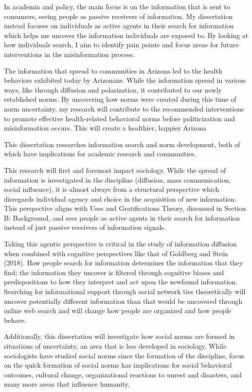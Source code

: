 In academia and policy, the main focus is on the information that is
sent to consumers, seeing people as passive receivers of information. My dissertation instead
focuses on individuals as active agents in their search for information
which helps me uncover the information individuals are exposed to. By
looking at how individuals search, I aim to identify pain points and focus areas for
future interventions in the misinformation process.

The information that spread to communities in Arizona led to the health
behaviors exhibited today by Arizonans. While the information spread in
various ways, like through diffusion and polarization, it contributed to
our newly established norms. By uncovering how norms were created during
this time of norm uncertainty, my research will contribute to the recommended interventions to promote effective health-related behavioral norms before politicization and
misinformation occurs. This will create a healthier, happier Arizona

This dissertation researches information search and norm development,
both of which have implications for academic research and communities.


This research will first and foremost impact sociology. While the spread
of information is investigated in the discipline (diffusion, mass
communication, social influence), it is almost always from a structural
perspective which disregards individual agency and choice in the
acquisition of new information. This perspective aligns with Uses and
Gratifications Theory, discussed in Section B: Background, and sees
people as active agents in their search for information instead of just
passive receivers of information signals.

Taking this agentic perspective is critical in the study of information
diffusion when combined with cognitive perspectives like that of
Goldberg and Stein (2018). How people search for information determines
the information that they find; the information they uncover is filtered
through cognitive biases and predispositions to how they interpret and
act upon the newfound information. Searching for informational support
through social network ties theoretically will uncover potentially
different information than that would be uncovered through online web
search and will change how people are organized and how people behave.

Additionally, this dissertation will investigate how social norms are
formed in situations of uncertainty, an area that is less developed in
sociology. While sociologists have studied social norms since the
formation of the discipline, focus on the quick formation of social
norms has implications for social behavioral outcomes, cultural change,
organizational reactions to unrest and disasters, and many more areas
that influence humanity.

